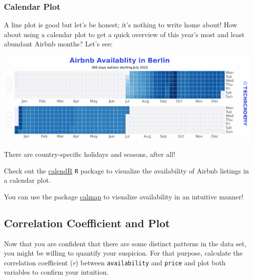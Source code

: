 \documentclass[
  11pt,
]{article}
\newenvironment{tips}[1]
  {
  \begin{itemize}
  \footnotesize
  \renewcommand{\labelitemi}{
    \raisebox{-.7\height}[0pt][0pt]{
      {\setkeys{Gin}{width=3em,keepaspectratio}
        \texttt{[image: images/\#1.png]}}
    }
  }
  \setlength{\fboxsep}{1em}
  \begin{rbox}
  \item
  }
  {
  \end{rbox}
  \end{itemize}
  }
\newenvironment{tipsp}[1]
  {
  \begin{itemize}
  \footnotesize
  \renewcommand{\labelitemi}{
    \raisebox{-.7\height}[0pt][0pt]{
      {\setkeys{Gin}{width=3em,keepaspectratio}
        \texttt{[image: images/\#1.png]}}
    }
  }
  \setlength{\fboxsep}{1em}
  \begin{pbox}
  \item
  }
  {
  \end{pbox}
  \end{itemize}
  }
\begin{document}
\hypertarget{calendar-plot}{%
\subsubsection{Calendar Plot}\label{calendar-plot}}

A line plot is good but let's be honest; it's nothing to write home about!
How about using a calendar plot to get a quick overview of this year's most and least abundant Airbnb months?
Let's see:

\begin{center}\includegraphics[width=1\linewidth]{plot/01_python/calendar} \end{center}

There are country-specific holidays and seasons, after all!

\begin{tips}r
Check out the \href{https://r-coder.com/calendar-plot-r/}{calendR} \texttt{R} package to visualize the availability of Airbnb listings in a calendar plot.

\end{tips}

\begin{tipsp}p
You can use the package \href{https://pythonhosted.org/calmap/}{calmap} to visualize availability in an intuitive manner!

\end{tipsp}

\hypertarget{correlation-coefficient-and-plot}{%
\subsection{Correlation Coefficient and Plot}\label{correlation-coefficient-and-plot}}

Now that you are confident that there are some distinct patterns in the data set, you might be willing to quantify your suspicion.
For that purpose, calculate the correlation coefficient (\emph{r}) between \texttt{availability} and \texttt{price} and plot both variables to confirm your intuition.
\end{document}
